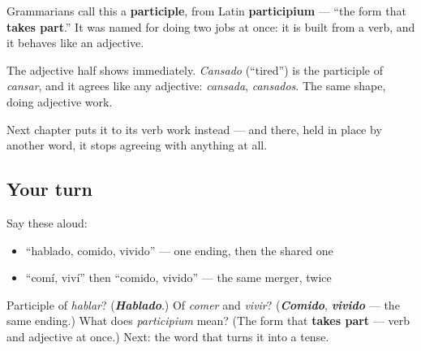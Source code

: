 \begin{cousinweb}
Grammarians call this a \textbf{participle}, from Latin \textbf{participium} — \textquotedblleft{}the form that \textbf{takes part}.\textquotedblright{} It was named for doing two jobs at once: it is built from a verb, and it behaves like an adjective.

The adjective half shows immediately. \emph{Cansado} (\textquotedblleft{}tired\textquotedblright{}) is the participle of \emph{cansar}, and it agrees like any adjective: \emph{cansada}, \emph{cansados}. The same shape, doing adjective work.

Next chapter puts it to its verb work instead — and there, held in place by another word, it stops agreeing with anything at all.
\end{cousinweb}

\subsection*{Your turn}
Say these aloud:

\begin{itemize}
\raggedright
  \item \textquotedblleft{}hablado, comido, vivido\textquotedblright{} — one ending, then the shared one
  \item \textquotedblleft{}comí, viví\textquotedblright{} then \textquotedblleft{}comido, vivido\textquotedblright{} — the same merger, twice
\end{itemize}

\begin{tcolorbox}[breakable,colback=teal!4,colframe=teal!35!black,title={Before you move on}]
Participle of \emph{hablar}? (\emph{\textbf{Hablado}}.) Of \emph{comer} and \emph{vivir}? (\emph{\textbf{Comido}}, \emph{\textbf{vivido}} — the same ending.) What does \emph{participium} mean? (The form that \textbf{takes part} — verb and adjective at once.) Next: the word that turns it into a tense.
\end{tcolorbox}
